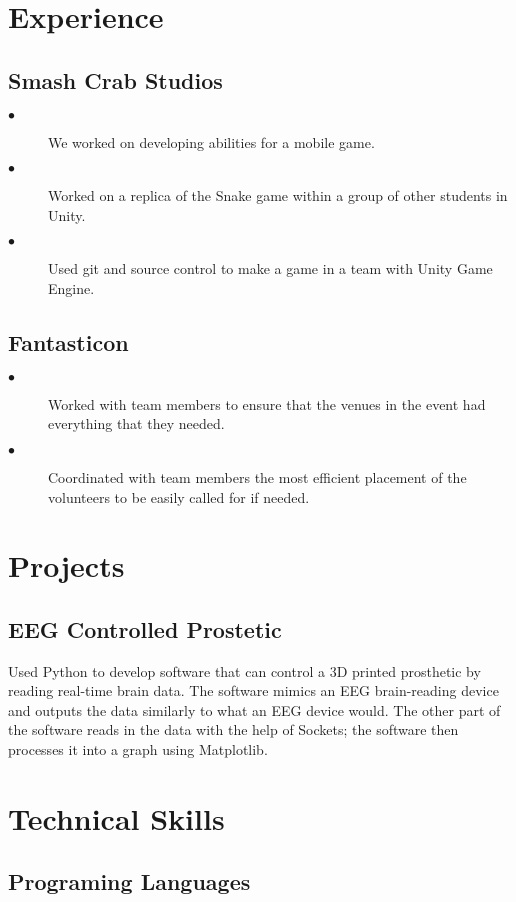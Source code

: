 \documentclass{article}
\begin{document}
\begin{multicols}{2}
    \section{Experience}
        \subsection{Smash Crab Studios}
        \begin{description}
            \item[$\bullet$]We worked on developing abilities for a mobile game.
            \item[$\bullet$]Worked on a replica of the Snake game within a group of other students in Unity. 
            \item[$\bullet$]Used git and source control to make a game in a team with Unity Game Engine.
        \end{description}
        \subsection{Fantasticon}
        \begin{description}
            \item[$\bullet$]Worked with team members to ensure that the venues in the event had everything that they needed.
            \item[$\bullet$]Coordinated with team members the most efficient placement of the volunteers to be easily called for if needed.
        \end{description}
        \columnbreak
    \section{Projects}
    \subsection{EEG Controlled Prostetic}
    Used Python to develop software that can control a 3D printed prosthetic by reading real-time brain data. 
    The software mimics an EEG brain-reading device and outputs the data similarly to what an EEG device would. 
    The other part of the software reads in the data with the help of Sockets; 
    the software then processes it into a graph using Matplotlib. 
    \section{Technical Skills}
        \subsection{Programing Languages}

\end{multicols}
\end{document}
